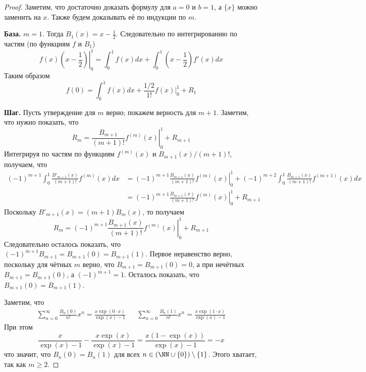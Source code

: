 \documentclass[12pt,a4paper]{article}
\begin{document}
    \begin{proof}
        Заметим, что достаточно доказать формулу для $a = 0$ и $b = 1$, а $\{x\}$ можно заменить на $x$. Также будем доказывать её по индукции по $m$.

        \textbf{База.} $m=1$. Тогда $B_1(x) = x - \frac{1}{2}$. Следовательно по интегрированию по частям (по функциям $f$ и $B_1$)
        \[\left.f(x)\left(x - \frac{1}{2}\right)\right|_0^1 = \int_0^1 f(x)dx + \int_0^1 \left(x - \frac{1}{2}\right)f'(x)dx\]
        Таким образом
        \[f(0) = \int_0^1 f(x)dx + \frac{1/2}{1!} \left.f(x)\right|_0^1 + R_1\]

        \textbf{Шаг.} Пусть утверждение для $m$ верно; покажем верность для $m+1$. Заметим, что нужно показать, что
        \[R_m = \left.\frac{B_{m+1}}{(m+1)!} f^{(m)}(x)\right|_0^1 + R_{m+1}\]
        Интегрируя по частям по функциям $f^{(m)}(x)$ и $B_{m+1}(x)/(m+1)!$, получаем, что
        \begin{align*}
            (-1)^{m+1}\int_0^1 \frac{B'_{m+1}(x)}{(m+1)!}f^{(m)}(x)dx
            &= (-1)^{m+1} \left.\frac{B_{m+1}(x)}{(m+1)!} f^{(m)}(x) \right|_0^1 + (-1)^{m+2} \int_0^1 \frac{B_{m+1}(x)}{(m+1)!}f^{(m+1)}(x)dx\\
            &= (-1)^{m+1} \left.\frac{B_{m+1}(x)}{(m+1)!} f^{(m)}(x) \right|_0^1 + R_{m+1}
        \end{align*}
        Поскольку $B'_{m+1}(x) = (m+1) B_m(x)$, то получаем
        \[R_m = (-1)^{m+1} \left.\frac{B_{m+1}(x)}{(m+1)!} f^{(m)}(x) \right|_0^1 + R_{m+1}\]
        Следовательно осталось показать, что $(-1)^{m+1}B_{m+1} = B_{m+1}(0) = B_{m+1}(1)$. Первое неравенство верно, поскольку для чётных $m$ верно, что $B_{m+1} = B_{m+1}(0) = 0$, а при нечётных $B_{m+1} = B_{m+1}(0)$, а $(-1)^{m+1} = 1$. Осталось показать, что $B_{m+1}(0) = B_{m+1}(1)$.

        Заметим, что
        \begin{align*}
            &\sum_{n=0}^\infty \frac{B_n(0)}{n!} x^n = \frac{x \exp(0 \cdot x)}{\exp(x) - 1}&
            &\sum_{n=0}^\infty \frac{B_n(1)}{n!} x^n = \frac{x \exp(1 \cdot x)}{\exp(x) - 1}&
        \end{align*}
        При этом
        \[\frac{x}{\exp(x) - 1} - \frac{x \exp(x)}{\exp(x) - 1} = \frac{x (1 - \exp(x))}{\exp(x) - 1} = -x\]
        что значит, что $B_n(0) = B_n(1)$ для всех $n \in (\NN \cup \{0\}) \setminus \{1\}$. Этого хватает, так как $m \geqslant 2$.
    \end{proof}

    \newpage\null\thispagestyle{empty}\newpage
\end{document}
